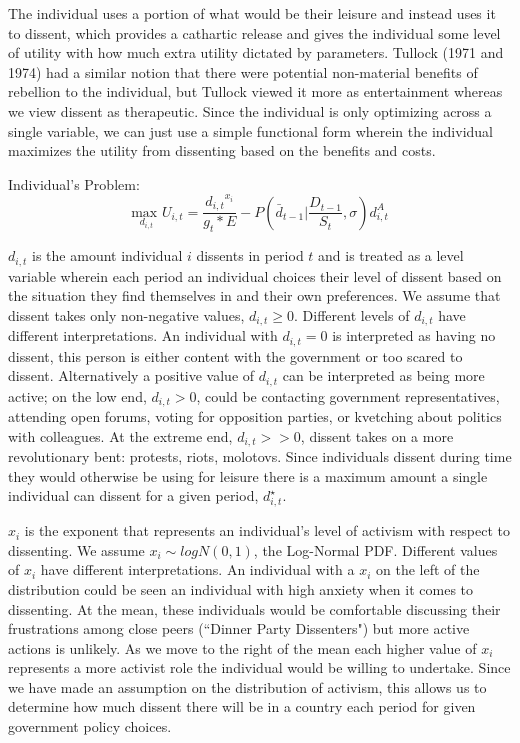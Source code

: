 \documentclass[12pt]{article}
\begin{document}
\begin{spacing}{1.5}
The individual uses a portion of what would be their leisure and instead uses it to dissent, which provides a cathartic release and gives the individual some level of utility with how much extra utility dictated by parameters. Tullock (1971 and 1974) had a similar notion that there were potential non-material benefits of rebellion to the individual, but Tullock viewed it more as entertainment whereas we view dissent as therapeutic. Since the individual is only optimizing across a single variable, we can just use a simple functional form wherein the individual maximizes the utility from dissenting based on the benefits and costs. 

\vspace{.5 em}
\noindent Individual's Problem:
\begin{equation}
{\underset{d_{i,t}}{\text{max }}}  U_{i,t}= \frac{{d_{i,t}}^{{x}_i}}{g_t * E} - P \left( \bar{d}_{t-1} \Bigg|\frac{D_{t-1}}{S_t},\sigma \right)d_{i,t}^A
\end{equation}

$ d_{i,t} $ is the amount individual $i$ dissents in period $t$ and is treated as a level variable wherein each period an individual choices their level of dissent based on the situation they find themselves in and their own preferences. We assume that dissent takes only non-negative values, $d_{i,t}\geq0$. Different levels of $d_{i,t}$ have different interpretations. An individual with $d_{i,t}=0$ is interpreted as having no dissent, this person is either content with the government or too scared to dissent. Alternatively a positive value of $d_{i,t}$ can be interpreted as being more active; on the low end, $d_{i,t}>0$, could be contacting government representatives, attending open forums, voting for opposition parties, or kvetching about politics with colleagues. At the extreme end, $d_{i,t}>>0$, dissent takes on a more revolutionary bent: protests, riots, molotovs. Since individuals dissent during time they would otherwise be using for leisure there is a maximum amount a single individual can dissent for a given period, $d_{i,t}^\star$. 

$x_i$ is the exponent that represents an individual's level of activism with respect to dissenting. We assume $x_i \sim logN(0,1)$, the Log-Normal PDF. Different values of $x_i$ have different interpretations. An individual with a $x_i$ on the left of the distribution could be seen an individual with high anxiety when it comes to dissenting. At the mean, these individuals would be comfortable discussing their frustrations among close peers (``Dinner Party Dissenters") but more active actions is unlikely. As we move to the right of the mean each higher value of $x_i$ represents a more activist role the individual would be willing to undertake. Since we have made an assumption on the distribution of activism, this allows us to determine how much dissent there will be in a country each period for given government policy choices.    


\end{spacing}
\end{document}
